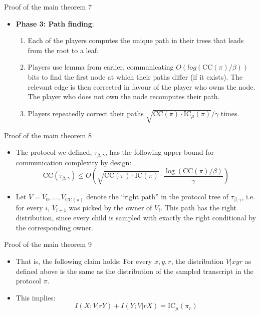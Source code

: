 \documentclass[10pt]{beamer}
\newcommand\CC{\textrm{CC}}
\newcommand\IC{\textrm{IC}}
\begin{document}
\begin{frame}{Proof of the main theorem 7}
\begin{itemize}
    \item \textbf{Phase 3: Path finding}: 
    \begin{enumerate}
    \pause
        \item Each of the players computes the unique path in their trees that leads from the root to a leaf.
        \vskip 0.2cm
        \pause
        \item Players use lemma from earlier, communicating $O(log(\CC(\pi)/\beta))$ bits to find the first node at which their paths differ (if it exists). The relevant edge is then corrected in favour of the player who owns the node. The player who does not own the node recomputes their path.
        \vskip 0.2cm
        \pause
        \item Players repeatedly correct their paths $\sqrt{\CC(\pi) \cdot \IC_\mu(\pi)}/\gamma$ times.
    \end{enumerate}
\end{itemize}
\end{frame}

\begin{frame}{Proof of the main theorem 8}
\begin{itemize}
    \item The protocol we defined, $\tau_{\beta, \gamma}$, has the following upper bound for communication complexity by design:
    $$ \CC(\tau_{\beta, \gamma}) \leq O \left( \sqrt{\CC(\pi) \cdot \IC(\pi)} \cdot  \frac{\log(\CC(\pi)/\beta)}{\gamma} \right)$$
    \pause
    \vskip 0.4cm
    \item Let $V = V_0, \ldots, V_{\CC(\pi)}$ denote the ``right path'' in the protocol tree of $\tau_{\beta, \gamma}$, i.e. for every $i$, $V_{i+1}$ was picked by the owner of $V_i$. This path has the right distribution, since every child is sampled with exactly the right conditional by the corresponding owner.
\end{itemize}
\end{frame}

\begin{frame}{Proof of the main theorem 9}
\begin{itemize}
    \item That is, the following claim holds: For every $x, y, r$, the distribution $V|xyr$ as defined above is the same as the distribution of the sampled transcript in the protocol $\pi$.
    \vskip 0.4cm
    \pause
    \item This implies:
    $$ I(X; V|rY) + I(Y; V|rX) = \IC_\mu(\pi_r) $$
\end{itemize}
\end{frame}
\end{document}
